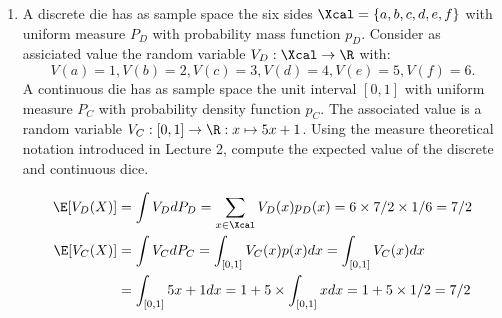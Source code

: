 \begin{enumerate}[resume*]
    \item %
    A discrete die has as sample space the six sides $\Xcal=\{a, b, c, d, e, f\}$ with uniform measure $P_D$ with probability mass function $p_D$. Consider as assiciated value the random variable $V_D:\Xcal \to \R$ with:
    \begin{equation*}
        V(a)=1, V(b)=2, V(c)=3, V(d)=4, V(e)=5, V(f)=6.
    \end{equation*}
    A continuous die has as sample space the unit interval $[0, 1]$ with uniform measure $P_C$ with probability density function $p_C$. The associated value is a random variable $V_C:[0,1] \to \R : x \mapsto 5 x + 1$. Using the measure theoretical notation introduced in Lecture 2, compute the expected value of the discrete and continuous dice.

    \begin{ungradedsolution}
        \begin{align*}
            \E[V_D(X)] & =\int V_D dP_D= \sum_{x \in \Xcal}V_D(x)p_D(x)=6 \times 7/2 \times 1/6 = 7/2 \\
            \E[V_C(X)] & =\int V_C dP_C= \int_{[0,1]}V_C(x)p(x)dx=\int_{[0,1]}V_C(x)dx                \\
                       & =\int_{[0,1]}5x+1dx=1+5 \times \int_{[0,1]}x dx = 1 + 5 \times 1/2=7/2
        \end{align*}
    \end{ungradedsolution}


\end{enumerate}
